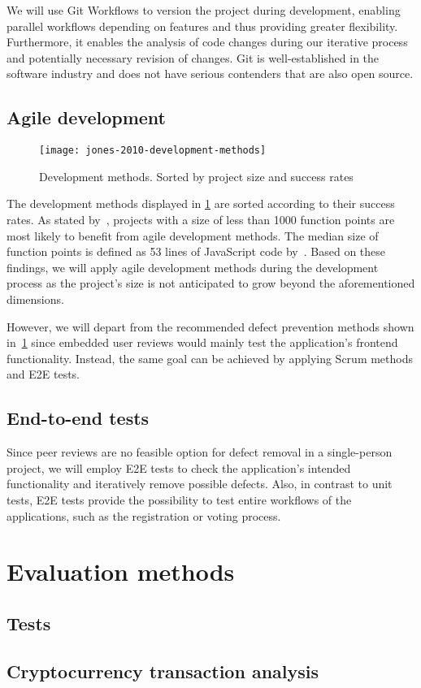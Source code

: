 We will use Git Workflows to version the project during development, enabling parallel workflows depending on features and thus providing greater flexibility.
Furthermore, it enables the analysis of code changes during our iterative process and potentially necessary revision of changes.
Git is well-established in the software industry and does not have serious contenders that are also open source.

\subsection{Agile development}\label{subsec:agile-development}

\begin{figure}
    \centering
    \texttt{[image: jones-2010-development-methods]}
    \caption[Development mehtods]{Development methods. Sorted by project size and success rates~\autocite[11]{jones_software_2010}}
    \label{fig:development-methods}
\end{figure}

The development methods displayed in \cref{fig:development-methods} are sorted according to their success rates.
As stated by~\textcite[10-12]{jones_software_2010}, projects with a size of less than 1000 function points are most likely to benefit from agile development methods.
The median size of function points is defined as 53 lines of JavaScript code by~\textcite{qsm_function_2009}.
Based on these findings, we will apply agile development methods during the development process as the project's size is not anticipated to grow beyond the aforementioned dimensions.

However, we will depart from the recommended defect prevention methods shown in~\cref{fig:development-methods} since embedded user reviews would mainly test the application’s frontend functionality.
Instead, the same goal can be achieved by applying Scrum methods and \gls{E2E} tests.

\subsection{End-to-end tests}\label{subsec:end-to-end-tests}

Since peer reviews are no feasible option for defect removal in a single-person project, we will employ E2E tests to check the application’s intended functionality and iteratively remove possible defects.
Also, in contrast to unit tests, \gls{E2E} tests provide the possibility to test entire workflows of the applications, such as the registration or voting process.

\section{Evaluation methods}\label{sec:evaluation-methods}

\subsection{Tests}\label{subsec:tests}
\subsection{Cryptocurrency transaction analysis}\label{subsec:crypto-currency-transaction-analysis}